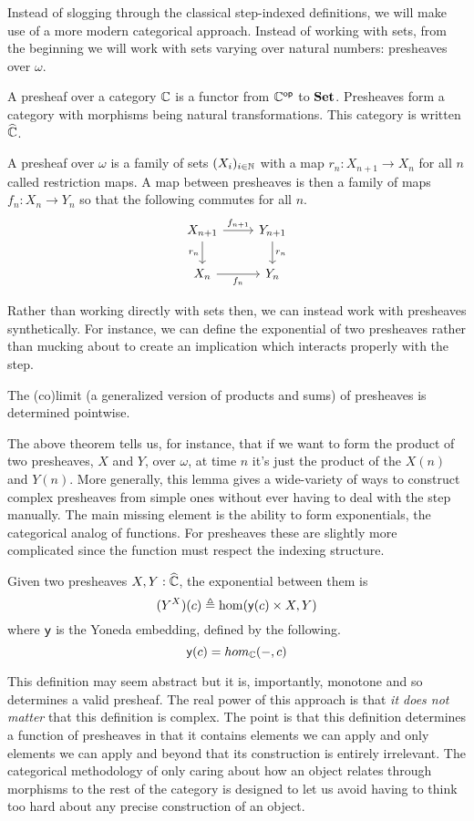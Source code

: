 Instead of slogging through the classical step-indexed definitions, we
will make use of a more modern categorical approach. Instead of
working with sets, from the beginning we will work with sets varying
over natural numbers: presheaves over $\omega$.
\begin{defn}
  A presheaf over a category $\mathbb{C}$ is a functor from $\mathbb{C}^{\mathsf{op}}$ to
  $\mathbf{Set}$. Presheaves form a category with morphisms being natural
  transformations. This category is written $\widehat{\mathbb{C}}$.
\end{defn}
\begin{example}
  A presheaf over $\omega$ is a family of sets $(X_i)_{i \in \mathbb{N}}$
  with a map $r_n : X_{n + 1} \to X_n$ for all $n$ called restriction
  maps. A map between presheaves is then a family of maps
  $f_n : X_n \to Y_n$ so that the following commutes for all $n$.
  \[
    \begin{tikzcd}
      X_{n + 1} \ar[r, "f_{n + 1}"] \ar[d, swap, "r_n"] & Y_{n + 1} \ar[d, "r_n"]\\
      X_n \ar[r, swap, "f_n"] & Y_n
    \end{tikzcd}
  \]
\end{example}
Rather than working directly with sets then, we can instead work with
presheaves synthetically. For instance, we can define the exponential
of two presheaves rather than mucking about to create an implication
which interacts properly with the step.
\begin{lem}
  The (co)limit (a generalized version of products and sums) of
  presheaves is determined pointwise.
\end{lem}
The above theorem tells us, for instance, that if we want to form the
product of two presheaves, $X$ and $Y$, over $\omega$, at time $n$ it's just the
product of the $X(n)$ and $Y(n)$. More generally, this lemma gives a
wide-variety of ways to construct complex presheaves from simple ones
without ever having to deal with the step manually. The main missing
element is the ability to form exponentials, the categorical analog of
functions. For presheaves these are slightly more complicated since
the function must respect the indexing structure.
\begin{lem}
  Given two presheaves $X, Y : \widehat{\mathbb{C}}$, the exponential
  between them is
  \[
    (Y^X)(c) \triangleq \hom(\mathsf{y}(c) \times X, Y)
  \]
  where $\mathsf{y}$ is the Yoneda embedding, defined by the following.
  \[
    \mathsf{y}(c) = hom_{\mathbb{C}}(-, c)
  \]
\end{lem}
This definition may seem abstract but it is, importantly,
monotone and so determines a valid presheaf. The real power of this
approach is that \emph{it does not matter} that this definition is
complex. The point is that this definition determines a function of
presheaves in that it contains elements we can apply and only elements
we can apply and beyond that its construction is entirely
irrelevant. The categorical methodology of only caring about how an
object relates through morphisms to the rest of the category is
designed to let us avoid having to think too hard about any precise
construction of an object. %


